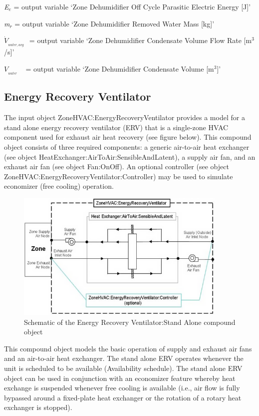 \emph{E\(_{e}\)} = output variable `Zone Dehumidifier Off Cycle Parasitic Electric Energy {[}J{]}'

\emph{m\(_{r}\)} = output variable `Zone Dehumidifier Removed Water Mass {[}kg{]}'

\({\dot V_{_{water,avg}}}\) \emph{\(_{ }\)} = output variable `Zone Dehumidifier Condensate Volume Flow Rate {[}m\(^{3}\)/s{]}'

\({V_{_{water}}}\) ~ = output variable `Zone Dehumidifier Condensate Volume {[}m\(^{3}\){]}'

\subsection{Energy Recovery Ventilator}\label{energy-recovery-ventilator}

The input object ZoneHVAC:EnergyRecoveryVentilator provides a model for a stand alone energy recovery ventilator (ERV) that is a single-zone HVAC component used for exhaust air heat recovery (see figure below). This compound object consists of three required components: a generic air-to-air heat exchanger (see object HeatExchanger:AirToAir:SensibleAndLatent), a supply air fan, and an exhaust air fan (see object Fan:OnOff). An optional controller (see object~ ZoneHVAC:EnergyRecoveryVentilator:Controller) may be used to simulate economizer (free cooling) operation.

\begin{figure}[hbtp] %
\centering
\includegraphics[width=0.9\textwidth, height=0.9\textheight, keepaspectratio=true]{media/image7321.png}
\caption{Schematic of the Energy Recovery Ventilator:Stand Alone compound object \protect \label{fig:schematic-of-the-energy-recovery-ventilator}}
\end{figure}

This compound object models the basic operation of supply and exhaust air fans and an air-to-air heat exchanger. The stand alone ERV operates whenever the unit is scheduled to be available (Availability schedule). The stand alone ERV object can be used in conjunction with an economizer feature whereby heat exchange is suspended whenever free cooling is available (i.e., air flow is fully bypassed around a fixed-plate heat exchanger or the rotation of a rotary heat exchanger is stopped).

